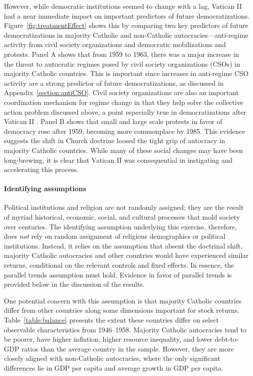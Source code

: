 \documentclass[12pt]{article}
\numberwithin{equation}{section}
\begin{document}
However, while democratic institutions seemed to change with a lag, Vatican II had a near immediate impact on important predictors of future democratizations. Figure~\ref{fig:treatmentEffect} shows this by comparing two key predictors of future democratizations in majority Catholic and non-Catholic autocracies---anti-regime activity from civil society organizations and democratic mobilizations and protests. Panel A shows that from 1959 to 1963, there was a major increase in the threat to autocratic regimes posed by civil society organizations (CSOs) in majority Catholic countries.  This is important since increases in anti-regime CSO activity are a strong predictor of future democratizations, as discussed in Appendix~\ref{section:antiCSO}. Civil society organizations are also an important coordination mechanism for regime change in that they help solve the collective action problem discussed above, a point especially true in democratizations after Vatican II \citep{Arato1981a,Arato1981b,Stepan1985,Stepan1988,Linz1996}. Panel B shows that small and large scale protests in favor of democracy rose after 1959,  becoming more commonplace by 1985. This evidence suggests the shift in Church doctrine loosed the tight grip of autocracy in majority Catholic countries. While many of these social changes may have been long-brewing, it is clear that Vatican II was consequential in instigating and accelerating this process.
\label{par:pol_cond_eff_end}

\paragraph{Identifying assumptions}

Political institutions and religion are not randomly assigned; they are the result of myriad historical, economic, social, and cultural processes that mold society over centuries. The identifying assumption underlying this exercise, therefore, does \textit{not} rely on random assignment of religious demographics or political institutions. Instead, it relies on the assumption that absent the doctrinal shift, majority Catholic autocracies and other countries would have experienced similar returns, conditional on the relevant controls and fixed effects. In essence, the parallel trends assumption must hold. Evidence in favor of parallel trends is provided below in the discussion of the results.

One potential concern with this assumption is that majority Catholic countries differ from other countries along some dimensions important for stock returns. Table~\ref{table:balance} presents the extent these countries differ on select observable characteristics from 1946--1958. Majority Catholic autocracies tend to be poorer, have higher inflation, higher resource inequality, and lower debt-to-GDP ratios than the average country in the sample. However, they are more closely aligned with non-Catholic autocracies, where the only significant differences lie in GDP per capita and average growth in GDP per capita.
\end{document}
